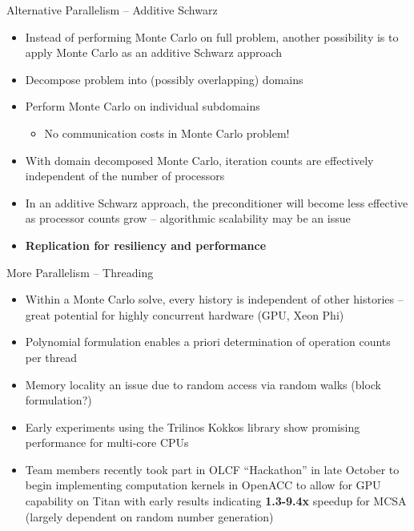 \documentclass{beamer}
\begin{document}
\begin{frame}{Alternative Parallelism -- Additive Schwarz}
  \begin{itemize}
    \item Instead of performing Monte Carlo on full problem, another
      possibility is to apply Monte Carlo as an additive Schwarz approach
    \vfill
    \item Decompose problem into (possibly overlapping) domains
    \vfill
    \item Perform Monte Carlo on individual subdomains
      \begin{itemize}
        \item No communication costs in Monte Carlo problem!
      \end{itemize}
    \vfill
    \item With domain decomposed Monte Carlo, iteration counts are effectively
      independent of the number of processors
    \vfill
    \item In an additive Schwarz approach, the preconditioner will become
      less effective as processor counts grow -- algorithmic scalability
      may be an issue
      \vfill
    \item \textbf{Replication for resiliency and performance}
  \end{itemize}
\end{frame}

\begin{frame}{More Parallelism -- Threading}
  \begin{itemize}
    \item Within a Monte Carlo solve, every history is independent of other
      histories -- great potential for highly concurrent hardware
      (GPU, Xeon Phi)
    \vfill
    \item Polynomial formulation enables a priori determination of
      operation counts per thread
      \vfill
    \item Memory locality an issue due to random access via random
      walks (block formulation?)
      \vfill
    \item Early experiments using the Trilinos Kokkos library show promising
      performance for multi-core CPUs
    \vfill
    \item Team members recently took part in OLCF ``Hackathon'' in
      late October to begin implementing computation kernels in
      OpenACC to allow for GPU capability on Titan with early results
      indicating \textbf{1.3-9.4x} speedup for MCSA (largely dependent
      on random number generation)
  \end{itemize}
\end{frame}
\end{document}
